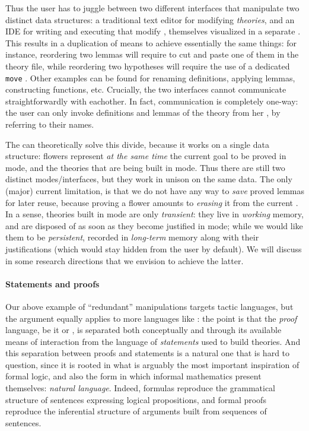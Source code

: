 \begin{scope}
Thus the user has to juggle between two different interfaces that manipulate two
distinct data structures: a traditional text editor for modifying
\emph{theories}, and an IDE for writing and executing  that
modify \emph{}, themselves visualized in a separate .
This results in a duplication of means to achieve essentially the same things:
for instance, reordering two lemmas will require to cut and paste one of them in
the theory file, while reordering two hypotheses will require the use of a
dedicated \texttt{move} . Other examples can be found for renaming
definitions, applying lemmas, constructing functions, etc. Crucially, the two
interfaces cannot communicate straightforwardly with eachother. In fact,
communication is completely one-way: the user can only invoke definitions and
lemmas of the theory from her , by referring to their names.

The  can theoretically solve this divide, because it works on a
single data structure: flowers represent \emph{at the same time} the current
goal to be proved in \Proof mode, and the theories that are being built in \Edit
mode. Thus there are still two distinct modes/interfaces, but they work in
unison on the same data. The only (major) current limitation, is that we do not
have any way to \emph{save} proved lemmas for later reuse, because proving a
flower amounts to \emph{erasing} it from the current . In a sense, theories
built in \Edit mode are only \emph{transient}: they live in \emph{working}
memory, and are disposed of as soon as they become justified in \Proof mode;
while we would like them to be \emph{persistent}, recorded in \emph{long-term}
memory along with their justifications (which would stay hidden from the user by
default). We will discuss in  some research directions that
we envision to achieve the latter. 

\paragraph{Statements and proofs}

Our above example of ``redundant'' manipulations targets  tactic
languages, but the argument equally applies to more  languages
like : the point is that the \emph{proof} language, be it  or
, is separated both conceptually and through its available means
of interaction from the language of \emph{statements} used to build theories.
And this separation between proofs and statements is a natural one that is hard
to question, since it is rooted in what is arguably the most important
inspiration of formal logic, and also the form in which informal mathematics
present themselves: \emph{natural language}. Indeed,  formulas
reproduce the grammatical structure of sentences expressing logical
propositions, and formal proofs reproduce the inferential structure of arguments
built from sequences of sentences.


\end{scope}
